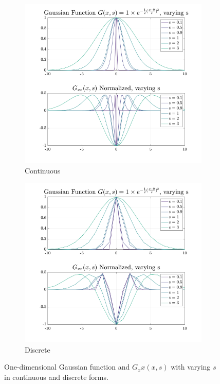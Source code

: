 \documentclass[usletter, 11pt, titlepage]{article}
\begin{document}
\begin{figure}[!h]
\centering
    \begin{subfigure}[b]{0.5\textwidth}            
            \includegraphics[width=\textwidth]{gaussian_continuous.png}
            \caption{Continuous}
            \label{fig:Gaussian cont}
    \end{subfigure}%
    \begin{subfigure}[b]{0.5\textwidth}
            \centering
            \includegraphics[width=\textwidth]{gaussian_discrete.png}
            \caption{Discrete}
            \label{fig:Gaussian disc}
    \end{subfigure}
    \caption{One-dimensional Gaussian function and  $G_xx(x,s)$ with varying $s$ in continuous and discrete forms.}
    \label{fig:Gaussian function}
\end{figure}
\end{document}
